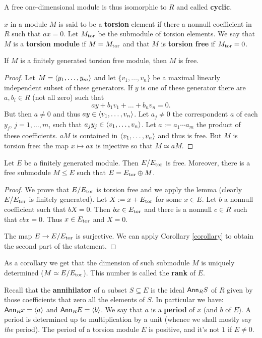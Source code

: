 A free one-dimensional module is thus isomorphic to $R$ and called \textbf{cyclic}. 

$x$ in a module $M$ is said to be a \textbf{torsion} element if there a nonnull coefficient in $R$ such that $ax=0$. 
Let $M_{\operatorname{tor}}$ be the submodule of torsion elements. 
We say that $M$ is a \textbf{torsion module} if $M=M_{\operatorname{tor}}$ and that $M$ is \textbf{torsion free} if $M_{\operatorname{tor}}=0$. 

\begin{lem} 
If $M$ is a finitely generated torsion free module, then $M$ is free. 
\begin{proof} 
Let $M=\langle y_1, \ldots, y_m\rangle$ and let $\{v_1, \ldots, v_n\}$ be a maximal linearly independent subset of these generators. 
If $y$ is one of these generator there are $a , b_i \in R$ (not all zero) such that 
$$ay + b_1 v_1 + \ldots + b_n v_n =0 \text{.}$$ 
But then $a \neq 0$ and thus $ay \in \langle v_1, \ldots, v_n\rangle$. 
Let $a_j \neq 0$ the correspondent $a$ of each $y_j$, $j=1, \ldots, m$, such that $a_j y_j \in \langle v_1, \ldots, v_n\rangle$. 
Let $a:=a_1 \cdots a_m$ the product of these coefficients. 
$aM$ is contained in $\langle v_1, \ldots, v_n\rangle$ and thus is free. 
But $M$ is torsion free: the map $x \mapsto ax$ is injective so that $M \simeq aM$.
\end{proof}
\end{lem}

\begin{thm} 
Let $E$ be a finitely generated module. 
Then $E/E_{\operatorname{tor}}$ is free. 
Moreover, there is a free submodule $M\le E$ such that $E = E_{\operatorname{tor}} \oplus M$. 
\begin{proof} We prove that $E/E_{\operatorname{tor}}$ is torsion free and we apply the lemma (clearly $E/E_{\operatorname{tor}}$ is finitely generated). 
Let $X:=x+ E_{\operatorname{tor}}$ for some $x \in E$. 
Let $b$ a nonnull coefficient such that $bX=0$. 
Then $bx \in E_{\operatorname{tor}}$ and there is a nonnull $c \in R$ such that $cbx=0$. 
Thus $x \in E_{\operatorname{tor}}$ and $X=0$.  

The map $E \to E/E_{\operatorname{tor}}$ is surjective. 
We can apply Corollary \ref{corollary} to obtain the second part of the statement. 
\end{proof}
\end{thm}

As a corollary we get that the dimension of such submodule $M$ is uniquely determined ($M \simeq E/E_{\operatorname{tor}}$).
This number is called the \textbf{rank} of $E$.

Recall that the \textbf{annihilator} of a subset $S\subseteq E$ is the ideal $\textsf{Ann}_R S$ of $R$ given by those coefficients that zero all the elements of $S$. 
In particular we have: $\textsf{Ann}_R x= \langle a\rangle$ and $\textsf{Ann}_R E= \langle b\rangle$. 
We say that $a$ is a \textbf{period} of $x$ (and $b$ of $E$). 
A period is determined up to multiplication by a unit (whence we shall mostly say \textit{the} period). 
The period of a torsion module $E$ is positive, and it's not $1$ if $E \neq 0$. 

